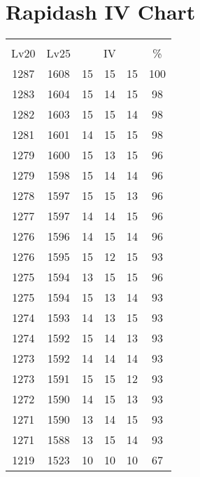 \documentclass{article}%
\begin{document}
%
\normalsize%
\section{Rapidash IV Chart}%
\label{sec:Rapidash IV Chart}%
\renewcommand{\arraystretch}{1.5}%
\begin{tabular}{|c|c|c|c|c|c|}%
\hline%
\multicolumn{6}{|c|}{\textcolor{white}{ 
\linebreak{Rapidash}
}%
\cellcolor{black}}\\%
\multicolumn{1}{|c}{Lv20}&\multicolumn{1}{c|}{Lv25}&\multicolumn{3}{c|}{IV}&\multicolumn{1}{|c|}{\%}\\%
\hline%
\rowcolor{color100}%
1287&1608&15&15&15&100\\%
\hline%
\rowcolor{color98}%
1283&1604&15&14&15&98\\%
\hline%
\rowcolor{color98}%
1282&1603&15&15&14&98\\%
\hline%
\rowcolor{color98}%
1281&1601&14&15&15&98\\%
\hline%
\rowcolor{color96}%
1279&1600&15&13&15&96\\%
\hline%
\rowcolor{color96}%
1279&1598&15&14&14&96\\%
\hline%
\rowcolor{color96}%
1278&1597&15&15&13&96\\%
\hline%
\rowcolor{color96}%
1277&1597&14&14&15&96\\%
\hline%
\rowcolor{color96}%
1276&1596&14&15&14&96\\%
\hline%
\rowcolor{color93}%
1276&1595&15&12&15&93\\%
\hline%
\rowcolor{color96}%
1275&1594&13&15&15&96\\%
\hline%
\rowcolor{color93}%
1275&1594&15&13&14&93\\%
\hline%
\rowcolor{color93}%
1274&1593&14&13&15&93\\%
\hline%
\rowcolor{color93}%
1274&1592&15&14&13&93\\%
\hline%
\rowcolor{color93}%
1273&1592&14&14&14&93\\%
\hline%
\rowcolor{color93}%
1273&1591&15&15&12&93\\%
\hline%
\rowcolor{color93}%
1272&1590&14&15&13&93\\%
\hline%
\rowcolor{color93}%
1271&1590&13&14&15&93\\%
\hline%
\rowcolor{color93}%
1271&1588&13&15&14&93\\%
\hline%
\rowcolor{color91}%
1219&1523&10&10&10&67\\%
\end{tabular}

%
\end{document}

